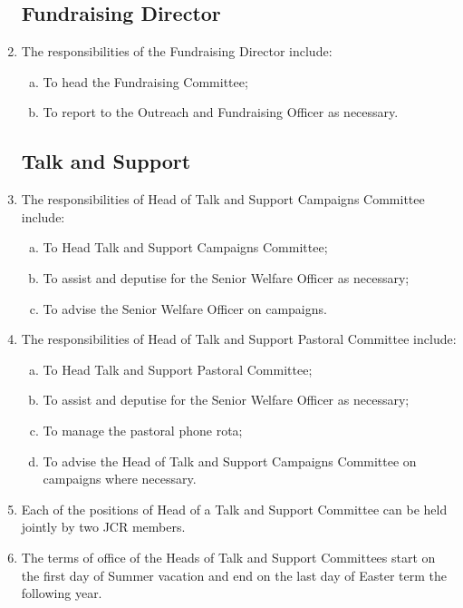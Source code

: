 \documentclass[12pt]{article}
\begin{document}
\begin{enumerate}
    \subsection{Fundraising Director}
    \item The responsibilities of the Fundraising Director include:
    \begin{enumerate}[(a)]
        \item To head the Fundraising Committee;
        \item To report to the Outreach and Fundraising Officer as necessary.
    \end{enumerate}

    \subsection{Talk and Support}
    \item The responsibilities of Head of Talk and Support Campaigns Committee include:
    \begin{enumerate}[(a)]
        \item To Head Talk and Support Campaigns Committee;
        \item To assist and deputise for the Senior Welfare Officer as necessary;
        \item To advise the Senior Welfare Officer on campaigns.
    \end{enumerate}
    \item The responsibilities of Head of Talk and Support Pastoral Committee include:
    \begin{enumerate}[(a)]
        \item To Head Talk and Support Pastoral Committee;
        \item To assist and deputise for the Senior Welfare Officer as necessary;
        \item To manage the pastoral phone rota;
        \item To advise the Head of Talk and Support Campaigns Committee on campaigns where necessary.
    \end{enumerate}
    \item Each of the positions of Head of a Talk and Support Committee can be held jointly by two JCR members.
    \item The terms of office of the Heads of Talk and Support Committees start on the first day of Summer vacation and end on the last day of Easter term the following year.

\end{enumerate}
\end{document}
